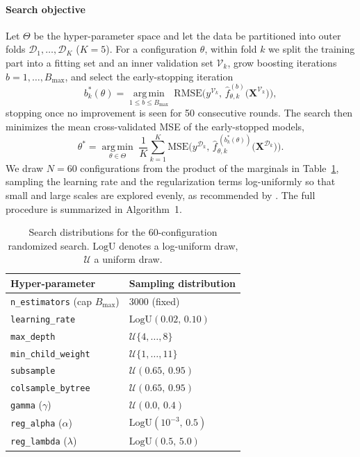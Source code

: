 \documentclass[journal]{IEEEtran}
\begin{document}
\paragraph{Search objective} Let $\Theta$ be the hyper-parameter space and let
the data be partitioned into outer folds $\mathcal{D}_1,\dots,\mathcal{D}_K$
($K=5$). For a configuration $\theta$, within fold $k$ we split the training part
into a fitting set and an inner validation set $\mathcal{V}_k$, grow boosting
iterations $b=1,\dots,B_{\max}$, and select the early-stopping iteration
\begin{equation}
b_k^{*}(\theta)=\operatorname*{arg\,min}_{1\le b\le B_{\max}}
\;\mathrm{RMSE}\!\Big(y^{\mathcal{V}_k},\,
\hat f^{(b)}_{\theta,k}\big(\mathbf{X}^{\mathcal{V}_k}\big)\Big),
\label{eq:earlystop}
\end{equation}
stopping once no improvement is seen for 50 consecutive rounds. The search then
minimizes the mean cross-validated MSE of the early-stopped models,
\begin{equation}
\theta^{*}=\operatorname*{arg\,min}_{\theta\in\Theta}\;
\frac{1}{K}\sum_{k=1}^{K}
\mathrm{MSE}\!\Big(y^{\mathcal{D}_k},\,
\hat f^{\,(b_k^{*}(\theta))}_{\theta,k}\big(\mathbf{X}^{\mathcal{D}_k}\big)\Big).
\label{eq:searchobj}
\end{equation}
We draw $N=60$ configurations from the product of the marginals in
Table~\ref{tab:search}, sampling the learning rate and the regularization terms
log-uniformly so that small and large scales are explored evenly, as recommended
by \cite{bergstra2012random}. The full procedure is summarized in
Algorithm~1.

\begin{table}[!t]
\caption{Search distributions for the 60-configuration randomized search.
$\mathrm{LogU}$ denotes a log-uniform draw, $\mathcal{U}$ a uniform draw.}
\label{tab:search}
\centering
\begin{tabular}{ll}
\toprule
Hyper-parameter & Sampling distribution \\
\midrule
\texttt{n\_estimators} (cap $B_{\max}$) & $3000$ (fixed) \\
\texttt{learning\_rate} & $\mathrm{LogU}(0.02,\,0.10)$ \\
\texttt{max\_depth} & $\mathcal{U}\{4,\dots,8\}$ \\
\texttt{min\_child\_weight} & $\mathcal{U}\{1,\dots,11\}$ \\
\texttt{subsample} & $\mathcal{U}(0.65,\,0.95)$ \\
\texttt{colsample\_bytree} & $\mathcal{U}(0.65,\,0.95)$ \\
\texttt{gamma} ($\gamma$) & $\mathcal{U}(0.0,\,0.4)$ \\
\texttt{reg\_alpha} ($\alpha$) & $\mathrm{LogU}(10^{-3},\,0.5)$ \\
\texttt{reg\_lambda} ($\lambda$) & $\mathrm{LogU}(0.5,\,5.0)$ \\
\bottomrule
\end{tabular}
\end{table}
\end{document}
